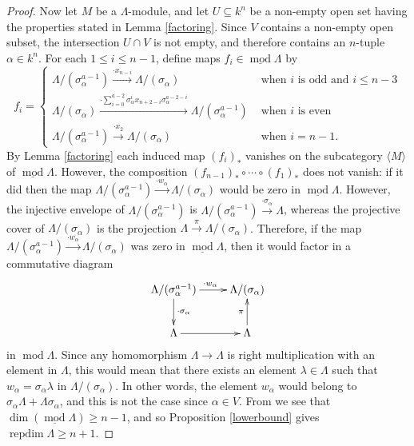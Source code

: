 \documentclass[a4paper]{amsart}
\theoremstyle{definition}
\theoremstyle{definition}
\theoremstyle{definition}
\theoremstyle{definition}
\theoremstyle{definition}
\theoremstyle{definition}
\theoremstyle{remark}
\theoremstyle{remark}
\theoremstyle{definition}
\theoremstyle{definition}
\begin{document}
\begin{proof}
Now let $M$ be a $\Lambda$-module, and let $U \subseteq k^n$ be a
non-empty open set having the properties stated in Lemma
\ref{factoring}. Since $V$ contains a non-empty open subset, the
intersection $U \cap V$ is not empty, and therefore contains an
$n$-tuple $\alpha \in k^n$. For each $1 \le i \le n-1$, define maps
$f_i \in \underline{\operatorname{mod}\nolimits} \Lambda$ by
$$f_i = \left \{
\begin{array}{ll}
\Lambda / ( \sigma_{\alpha}^{a-1} ) \xrightarrow{\cdot x_{n-i}}
\Lambda / ( \sigma_{\alpha} ) & \text{ when } i \text{ is odd and }
i \le n-3 \\
\Lambda / ( \sigma_{\alpha} ) \xrightarrow{\cdot \sum_{i=0}^{a-2}
\sigma_{\alpha}^i x_{n+2-i} \sigma_{\alpha}^{a-2-i}} \Lambda / (
\sigma_{\alpha}^{a-1} ) & \text{ when } i \text{ is even} \\
\Lambda / ( \sigma_{\alpha}^{a-1} ) \xrightarrow{\cdot x_2} \Lambda
/ ( \sigma_{\alpha} ) & \text{ when } i=n-1.
\end{array} \right.$$
By Lemma \ref{factoring} each induced map $(f_i)_*$ vanishes on the
subcategory $\langle M \rangle$ of $\underline{\operatorname{mod}\nolimits} \Lambda$.
However, the composition $(f_{n-1})_* \circ \cdots \circ (f_1)_*$
does not vanish: if it did then the map $\Lambda / (
\sigma_{\alpha}^{a-1} ) \xrightarrow{\cdot w_{\alpha}} \Lambda / (
\sigma_{\alpha} )$ would be zero in $\underline{\operatorname{mod}\nolimits} \Lambda$.
However, the injective envelope of $\Lambda / (
\sigma_{\alpha}^{a-1} )$ is $\Lambda / ( \sigma_{\alpha}^{a-1} )
\xrightarrow{\cdot \sigma_{\alpha}} \Lambda$, whereas the projective
cover of $\Lambda / ( \sigma_{\alpha} )$ is the projection $\Lambda
\xrightarrow{\pi} \Lambda / ( \sigma_{\alpha} )$. Therefore, if the
map $\Lambda / ( \sigma_{\alpha}^{a-1} ) \xrightarrow{\cdot
w_{\alpha}} \Lambda / ( \sigma_{\alpha} )$ was zero in
$\underline{\operatorname{mod}\nolimits} \Lambda$, then it would factor in a commutative
diagram
$$\xymatrix{
\Lambda / ( \sigma_{\alpha}^{a-1} ) \ar[d]^{\cdot \sigma_{\alpha}}
\ar[r]^{\cdot w_{\alpha}} & \Lambda / ( \sigma_{\alpha} ) \\
\Lambda \ar[r] & \Lambda \ar[u]^{\pi} }$$ in ${\operatorname{mod}\nolimits} \Lambda$. Since
any homomorphism $\Lambda \to \Lambda$ is right multiplication with
an element in $\Lambda$, this would mean that there exists an
element $\lambda \in \Lambda$ such that $w_{\alpha} =
\sigma_{\alpha} \lambda$ in $\Lambda / ( \sigma_{\alpha} )$. In
other words, the element $w_{\alpha}$ would belong to
$\sigma_{\alpha} \Lambda + \Lambda \sigma_{\alpha}$, and this is not
the case since $\alpha \in V$. From \cite[Lemma 4.11]{Rouquier1} we
see that $\dim ( \underline{\operatorname{mod}\nolimits} \Lambda ) \ge n-1$, and so
Proposition \ref{lowerbound} gives ${\operatorname{repdim}\nolimits} \Lambda \ge n+1$.
\end{proof}
\end{document}
